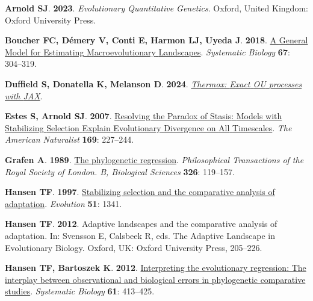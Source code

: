 \documentclass[
  letterpaper,
  DIV=11,
  numbers=noendperiod]{scrartcl}
\newlength{\cslhangindent}
\newenvironment{CSLReferences}[2] %
 {\begin{list}{}{%
  \setlength{\itemindent}{0pt}
  \setlength{\leftmargin}{0pt}
  \setlength{\parsep}{0pt}
  \ifodd #1
   \setlength{\leftmargin}{\cslhangindent}
   \setlength{\itemindent}{-1\cslhangindent}
  \fi
  \setlength{\itemsep}{#2\baselineskip}}}
 {\end{list}}
\begin{document}
\label{refs}
\begin{CSLReferences}{0}{1}
\textbf{\textbf{Arnold SJ}}. \textbf{2023}. \emph{Evolutionary
{Quantitative} {Genetics}}. Oxford, United Kingdom: Oxford University
Press.

\textbf{\textbf{Boucher FC}, \textbf{Démery V}, \textbf{Conti E},
\textbf{Harmon LJ}, \textbf{Uyeda J}}. \textbf{2018}.
\href{https://doi.org/10.1093/sysbio/syx075}{A {General} {Model} for
{Estimating} {Macroevolutionary} {Landscapes}}. \emph{Systematic
Biology} \textbf{67}: 304--319.

\textbf{\textbf{Duffield S}, \textbf{Donatella K}, \textbf{Melanson D}}.
\textbf{2024}.
\emph{\href{https://github.com/normal-computing/thermox}{Thermox:
{Exact} {OU} processes with {JAX}}}.

\textbf{\textbf{Estes S}, \textbf{Arnold SJ}}. \textbf{2007}.
\href{https://doi.org/10.1086/510633}{Resolving the {Paradox} of
{Stasis}: {Models} with {Stabilizing} {Selection} {Explain}
{Evolutionary} {Divergence} on {All} {Timescales}}. \emph{The American
Naturalist} \textbf{169}: 227--244.

\textbf{\textbf{Grafen A}}. \textbf{1989}.
\href{https://doi.org/10.1098/rstb.1989.0106}{The phylogenetic
regression}. \emph{Philosophical Transactions of the Royal Society of
London. B, Biological Sciences} \textbf{326}: 119--157.

\textbf{\textbf{Hansen TF}}. \textbf{1997}.
\href{https://doi.org/10.2307/2411186}{Stabilizing selection and the
comparative analysis of adaptation}. \emph{Evolution} \textbf{51}: 1341.

\textbf{\textbf{Hansen TF}}. \textbf{2012}. Adaptive landscapes and the
comparative analysis of adaptation. In: Svensson E, Calsbeek R, eds. The
{Adaptive} {Landscape} in {Evolutionary} {Biology}. Oxford, UK: Oxford
University Press, 205--226.

\textbf{\textbf{Hansen TF}, \textbf{Bartoszek K}}. \textbf{2012}.
\href{https://doi.org/10.1093/sysbio/syr122}{Interpreting the
evolutionary regression: The interplay between observational and
biological errors in phylogenetic comparative studies}. \emph{Systematic
Biology} \textbf{61}: 413--425.


\end{CSLReferences}
\end{document}
